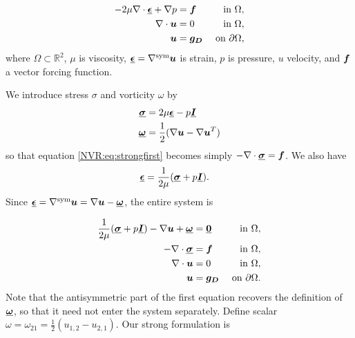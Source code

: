 \begin{align}
- 2 \mu \NVRdiv \NVRtensor{\epsilon} + \NVRgrad p &= \NVRvect{f} & \text{ in } \Omega, \label{NVR:eq:strongfirst} \\
\NVRdiv \NVRvect{u} &= 0 & \text{ in } \Omega, \\
\NVRvect{u} &= \NVRvect{g_{D}} & \text{ on } \partial\Omega,\label{NVR:eq:stronglast}
\end{align}
where $\Omega \subset \mathbb{R}^{2}$, $\mu$ is viscosity, $\NVRtensor{\epsilon}=\NVRgrad^{\text{sym}} \NVRvect{u}$ is strain, $p$ is pressure, $u$ velocity, and $\NVRvect{f}$ a vector forcing function.

We introduce stress $\sigma$ and vorticity $\omega$ by
\begin{align*}
\NVRtensor{\sigma} &= 2 \mu \NVRtensor{\epsilon} - p\NVRtensor{I}\\
\NVRtensor{\omega} &= \frac{1}{2}(\NVRgrad \NVRvect{u} - \NVRgrad \NVRvect{u}^{T})
\end{align*}
so that equation \eqref{NVR:eq:strongfirst} becomes simply $-\NVRdiv \NVRtensor{\sigma} = \NVRvect{f}$.
We also have
\begin{align*}
\NVRtensor{\epsilon} &= \frac{1}{2 \mu}(\NVRtensor{\sigma} + p\NVRtensor{I}).
\end{align*}
Since $\NVRtensor{\epsilon} = \NVRgrad^{\text{sym}} \NVRvect{u} = \NVRgrad \NVRvect{u} - \NVRtensor{\omega}$, the entire system is

\begin{align*}
\frac{1}{2 \mu}(\NVRtensor{\sigma} + p\NVRtensor{I}) - \NVRgrad \NVRvect{u} + \NVRtensor{\omega} &= \NVRtensor{0}  & \text{ in } \Omega, \\
- \NVRdiv \NVRtensor{\sigma} &= \NVRvect{f} & \text{ in } \Omega, \\
\NVRdiv \NVRvect{u} &= 0 & \text{ in } \Omega, \\
\NVRvect{u} &= \NVRvect{g_{D}} & \text{ on } \partial\Omega.
\end{align*}
Note that the antisymmetric part of the first equation recovers the definition of $\NVRtensor{\omega}$, so that it need not enter the system separately.
Define scalar $\omega = \omega_{21} = \frac{1}{2}(u_{1,2} - u_{2,1})$.  Our strong formulation is

